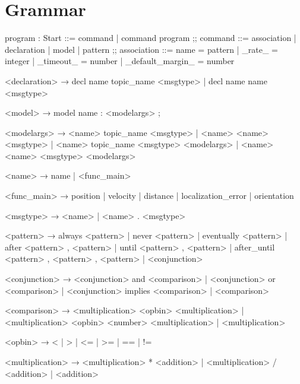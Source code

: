 \section{Grammar}

\begin{bnfgrammar}
    program : Start
    ::=
    command
    | command program
    ;;
    command ::=
    association
    | declaration
    | model
    | pattern
    ;; 
    association ::=
    name = pattern
    | \_rate\_ = integer
    | \_timeout\_ = number
    | \_default\_margin\_ = number
\end{bnfgrammar}


   <declaration> → decl name topic\_name <msgtype>
                 | decl name name <msgtype>

         <model> → model name : <modelargs> ;

     <modelargs> → <name> topic\_name <msgtype>
                 | <name> <name> <msgtype>
                 | <name> topic\_name <msgtype> <modelargs>
                 | <name> <name> <msgtype> <modelargs>

          <name> → name
                 | <func\_main>

     <func\_main> → position
                 | velocity
                 | distance
                 | localization\_error
                 | orientation

       <msgtype> → <name>
                 | <name> . <msgtype>

       <pattern> → always <pattern>
                 | never <pattern>
                 | eventually <pattern>
                 | after <pattern> , <pattern>
                 | until <pattern> , <pattern>
                 | after\_until <pattern> , <pattern> , <pattern>
                 | <conjunction>

   <conjunction> → <conjunction> and <comparison>
                 | <conjunction> or <comparison>
                 | <conjunction> implies <comparison>
                 | <comparison>

    <comparison> → <multiplication> <opbin> <multiplication>
                 | <multiplication> <opbin> { <number> } <multiplication>
                 | <multiplication>

         <opbin> → <
                 | >
                 | <=
                 | >=
                 | ==
                 | !=

<multiplication> → <multiplication> * <addition>
                 | <multiplication> / <addition>
                 | <addition>

